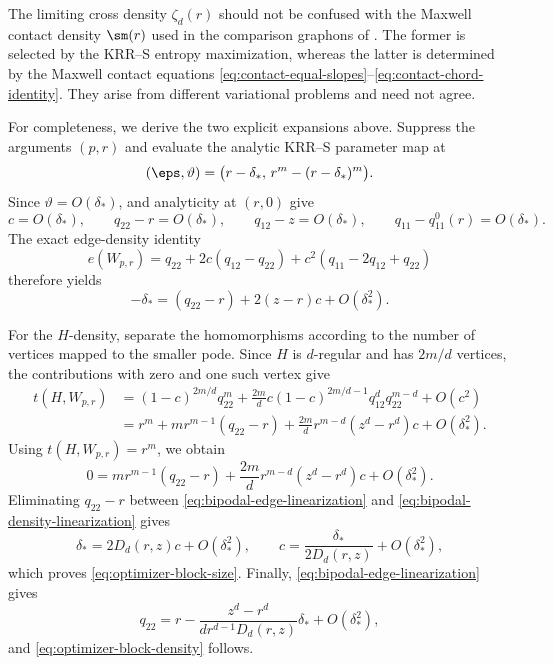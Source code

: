 \begin{remark}
The limiting cross density \(\zeta_d(r)\) should not be confused with the
Maxwell contact density \(\sm(r)\) used in the comparison graphons of
.  The former is selected by the KRR--S entropy
maximization, whereas the latter is determined by the Maxwell contact
equations \eqref{eq:contact-equal-slopes}--\eqref{eq:contact-chord-identity}.  They arise from
different variational problems and need not agree.

For completeness, we derive the two explicit expansions above.  Suppress the
arguments \((p,r)\) and evaluate the analytic KRR--S parameter map at
\[
  (\eps,\vartheta)
  =\bigl(r-\delta_*,\,r^m-(r-\delta_*)^m\bigr).
\]
Since \(\vartheta=O(\delta_*)\),  and analyticity at
\((r,0)\) give
\[
  c=O(\delta_*),\qquad
  q_{22}-r=O(\delta_*),\qquad
  q_{12}-z=O(\delta_*),\qquad
  q_{11}-q_{11}^0(r)=O(\delta_*).
\]
The exact edge-density identity
\[
  e(W_{p,r})
  =q_{22}+2c(q_{12}-q_{22})
   +c^2(q_{11}-2q_{12}+q_{22})
\]
therefore yields
\begin{equation}\label{eq:bipodal-edge-linearization}
  -\delta_*=(q_{22}-r)+2(z-r)c+O(\delta_*^2).
\end{equation}

For the \(H\)-density, separate the homomorphisms according to the number of
vertices mapped to the smaller pode.  Since \(H\) is \(d\)-regular and has
\(2m/d\) vertices, the contributions with zero and one such vertex give
\begin{align*}
  t(H,W_{p,r})
  &=(1-c)^{2m/d}q_{22}^m
    +\frac{2m}{d}c(1-c)^{2m/d-1}
      q_{12}^d q_{22}^{m-d}+O(c^2)\\
  &=r^m+m r^{m-1}(q_{22}-r)
    +\frac{2m}{d}r^{m-d}(z^d-r^d)c
    +O(\delta_*^2).
\end{align*}
Using \(t(H,W_{p,r})=r^m\), we obtain
\begin{equation}\label{eq:bipodal-density-linearization}
  0=m r^{m-1}(q_{22}-r)
    +\frac{2m}{d}r^{m-d}(z^d-r^d)c
    +O(\delta_*^2).
\end{equation}
Eliminating \(q_{22}-r\) between
\eqref{eq:bipodal-edge-linearization} and
\eqref{eq:bipodal-density-linearization} gives
\[
  \delta_*=2D_d(r,z)c+O(\delta_*^2),
  \qquad
  c=\frac{\delta_*}{2D_d(r,z)}+O(\delta_*^2),
\]
which proves \eqref{eq:optimizer-block-size}.  Finally,
\eqref{eq:bipodal-edge-linearization} gives
\[
  q_{22}
  =r-\frac{z^d-r^d}{d r^{d-1}D_d(r,z)}\delta_*
   +O(\delta_*^2),
\]
and \eqref{eq:optimizer-block-density} follows.
\end{remark}